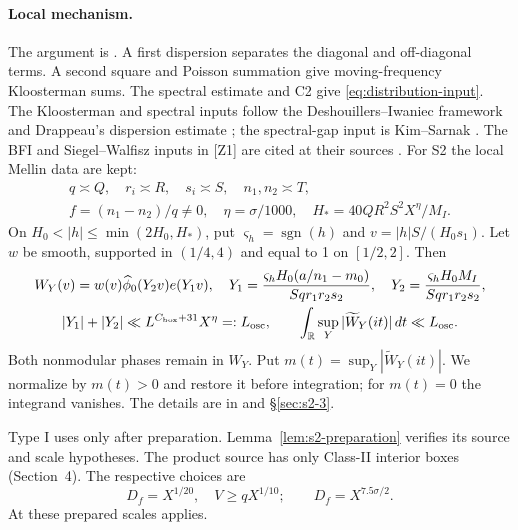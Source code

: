 \paragraph{Local mechanism.}\label{p2:dispersion-proof}
The argument is \cite[(3.26)--(3.90)]{Z1}.
A first dispersion separates the diagonal and off-diagonal terms.
A second square and Poisson summation give moving-frequency Kloosterman sums.
The spectral estimate and C2 give \eqref{eq:distribution-input}.
The Kloosterman and spectral inputs follow the Deshouillers--Iwaniec
framework and Drappeau's dispersion estimate \cite{ref1,ref3};
the spectral-gap input is Kim--Sarnak \cite{ref7}.
The BFI and Siegel--Walfisz inputs in [Z1] are cited at their sources
\cite{ref2,Siegel1935,Walfisz1936,ref11}.
For S2 the local Mellin data are kept:
\[
\begin{gathered}
 q\asymp Q,\quad r_i\asymp R,\quad s_i\asymp S,\quad n_1,n_2\asymp T,\\
 f=(n_1-n_2)/q\ne0,\quad\eta=\sigma/1000,\quad H_*=40QR^2S^2X^\eta/M_I.
\end{gathered}
\]
On $H_0<|h|\le\min(2H_0,H_*)$, put
$\varsigma_h=\operatorname{sgn}(h)$ and $v=|h|S/(H_0s_1)$.
Let $w$ be smooth, supported in $(1/4,4)$ and equal to 1 on $[1/2,2]$.
Then
\begin{equation}\label{p2:eq:dispersion-mellin}
\begin{gathered}
 W_Y(v)=w(v)\widehat\phi_0(Y_2v)e(Y_1v),\quad
 Y_1={\varsigma_hH_0(a/n_1-m_0)\over Sqr_1r_2s_2},\quad
 Y_2={\varsigma_hH_0M_I\over Sqr_1r_2s_2},\\
 |Y_1|+|Y_2|\ll L^{C_{\rm box}+31}X^\eta=:L_{\rm osc},\qquad
 \int_{\mathbb R}\sup_Y|\widetilde W_Y(it)|\,dt\ll L_{\rm osc}.
\end{gathered}
\end{equation}
Both nonmodular phases remain in $W_Y$.
Put $m(t)=\sup_Y|\widetilde W_Y(it)|$.
We normalize by $m(t)>0$ and restore it before integration;
for $m(t)=0$ the integrand vanishes.
The details are in \cite[(3.56)--(3.65)]{Z1} and \S\ref{sec:s2-3}.

Type I uses \cite[Lemmas~3.3--3.5, \S3.11]{Z1} only after preparation.
Lemma~\ref{lem:s2-preparation} verifies its source and scale hypotheses.
The product source has only Class-II interior boxes (Section~4).
The respective choices are
\[
 D_f=X^{1/20},\quad V\ge qX^{1/10};\qquad D_f=X^{7.5\sigma/2}.
\]
At these prepared scales \cite[(3.102)--(3.115)]{Z1} applies.


